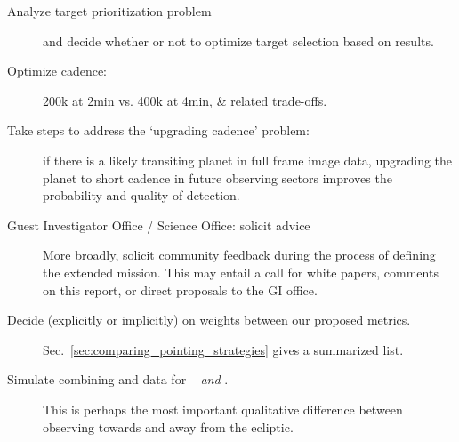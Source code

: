 \begin{description}
	\item[Analyze target prioritization problem] and decide whether or not to optimize target selection based on results. %
	
	\item[Optimize cadence:] 200k at 2min vs. 400k at 4min, \& related trade-offs.
	
	\item[Take steps to address the `upgrading cadence' problem:] 
	if there is a likely transiting planet in full frame image data, upgrading the planet to short cadence in future observing sectors improves the probability and quality of detection.
	
	\item[Guest Investigator Office / \tess Science Office: solicit advice]
	More broadly, solicit community feedback during the process of defining the extended mission.
	This may entail a call for white papers, comments on this report, or direct proposals to the GI office. 
	
	\item[Decide (explicitly or implicitly) on weights between our proposed metrics.]
	Sec.~\ref{sec:comparing_pointing_strategies} gives a summarized list.
	
	\item[Simulate combining \tess and \ktwo data for \rm{\elong\ } \textit{and} \rm{\eshort}.] 
	This is perhaps the most important qualitative difference between observing towards and away from the ecliptic.
	

\end{description}
